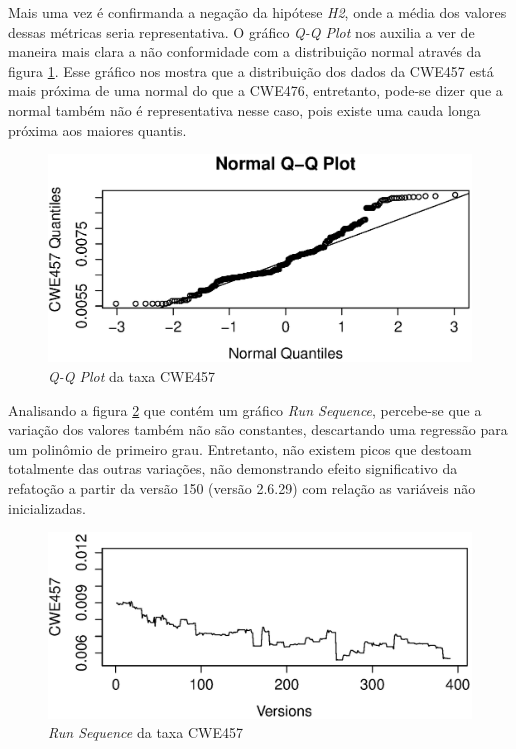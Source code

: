 Mais uma vez é confirmanda a negação da hipótese \textit{H2}, onde a média dos
valores dessas métricas seria representativa. O gráfico \textit{Q-Q Plot} nos
auxilia a ver de maneira mais clara a não conformidade com a distribuição normal
através da figura \ref{fig:cwe457-qq-plot}. Esse gráfico nos mostra que a
distribuição dos dados da CWE457 está mais próxima de uma normal do que a
CWE476, entretanto, pode-se dizer que a normal também não é representativa nesse
caso, pois existe uma cauda longa próxima aos maiores quantis.

\begin{figure}[h]
  \centering
  \includegraphics[width=1.0\textwidth]
      {figuras/cwe457-qq-plot.eps}
      \caption{\textit{Q-Q Plot} da taxa CWE457}
  \label{fig:cwe457-qq-plot}
\end{figure}

Analisando a figura \ref{fig:cwe457-run-sequence} que contém um gráfico
\textit{Run Sequence}, percebe-se que a variação dos valores também não são
constantes, descartando uma regressão para um polinômio de primeiro grau.
Entretanto, não existem picos que destoam totalmente das outras variações, não
demonstrando efeito significativo da refatoção a partir da versão 150 (versão
2.6.29) com relação as variáveis não inicializadas.

\begin{figure}[h]
  \centering
  \includegraphics[width=1.0\textwidth]
      {figuras/cwe457-run-sequence.eps}
      \caption{\textit{Run Sequence} da taxa CWE457}
  \label{fig:cwe457-run-sequence}
\end{figure}

